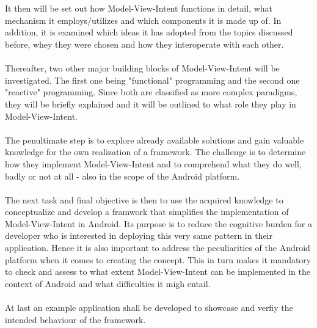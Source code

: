 \\
\\
It then will be set out how Model-View-Intent functions in detail, what mechanism it employs/utilizes and which components it is made up of. In addition, it is examined which 
ideas it has adopted from the topics discussed before, whey they were chosen and how they interoperate with each other.
\\
\\
Thereafter, two other major building blocks of Model-View-Intent will be investigated. The first one being "functional" programming and the second one "reactive" programming.
Since both are classified as more complex paradigms, they will be briefly explained and it will be outlined to what role they play in Model-View-Intent.
\\
\\
The penultimate step is to explore already available solutions and gain valuable knowledge for the own realization of a framework. The challenge is to determine
how they implement Model-View-Intent and to comprehend what they do well, badly or not at all - also in the scope of the Android platform.
\\
\\
The next task and final objective is then to use the acquired knowledge to conceptualize and develop a framwork that simplifies the implementation of Model-View-Intent in Android. 
Its purpose is to reduce the cognitive burden for a developer who is interested in deploying this very same pattern in their application. Hence it is also important to address the 
peculiarities of the Android platform when it comes to creating the concept. This in turn makes it mandatory to check and assess to what extent Model-View-Intent can be implemented 
in the context of Android and what difficulties it migh entail.
\\
\\
At last an example application shall be developed to showcase and verfiy the intended behaviour of the framework.